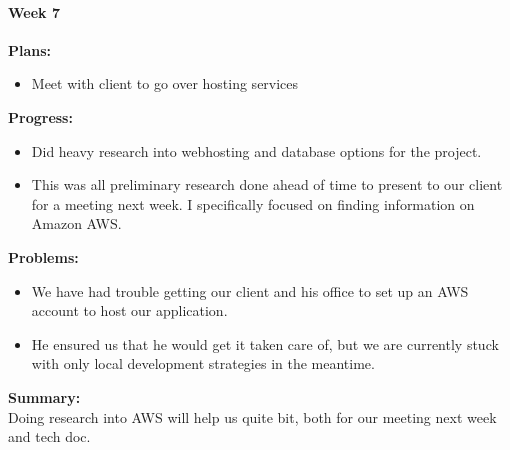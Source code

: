 \paragraph{Week 7}
\begin{adjustwidth}{2.5em}{0pt}
    \vspace{-0.5cm}\textbf{Plans:}
    \vspace{-0.5cm}
    \begin{itemize}
        \item Meet with client to go over hosting services
    \end{itemize} 
    \vspace{-0.3cm}\textbf{Progress:}
    \vspace{-0.5cm}
    \begin{itemize}
        \item Did heavy research into webhosting and database options for the project.
        \item This was all preliminary research done ahead of time to present to our client for a meeting next week. I specifically focused on finding information on Amazon AWS. 
    \end{itemize} 
    \vspace{-0.3cm}\textbf{Problems:}
    \vspace{-0.5cm}
    \begin{itemize}
        \item We have had trouble getting our client and his office to set up an AWS account to host our application. 
		\item He ensured us that he would get it taken care of, but we are currently stuck with only local development strategies in the meantime. 
	\end{itemize}  
    \vspace{-0.3cm}\noindent\textbf{Summary:}\\
    \noindent Doing research into AWS will help us quite bit, both for our meeting next week and tech doc. 
\end{adjustwidth} 
